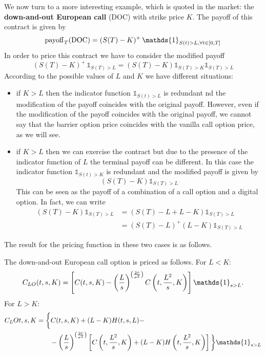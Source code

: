 We now turn to a more interesting example, which is quoted in the market: the \textbf{down-and-out European call} (DOC) with strike price $K$. The payoff of this contract is given by
\begin{equation}
  \pay_T(\text{DOC}) = (S(T)-K)^+\,\mathds{1}_{S(t)>L,\forall t\in[0,T]}
\end{equation}
In order to price this contract we have to consider the modified payoff
\begin{equation}
  (S(T)-K)^+\,\mathds{1}_{S(T)>L} = (S(T)-K)\mathds{1}_{S(T)>K}\mathds{1}_{S(T)>L}
\end{equation}
According to the possible values of $L$ and $K$ we have different situations:
\begin{itemize}
  \item if $K>L$ then the indicator function $\mathds{1}_{S(t)>L}$ is redundant nd the modification of the payoff coincides with the original payoff. However, even if the modification of the payoff coincides with the original payoff, we cannot say that the barrier option price coincides with the vanilla call option price, as we will see.
  \item if $K>L$ then we can exercise the contract but due to the presence of the indicator function of $L$ the terminal payoff can be different. In this case the indicator function $\mathds{1}_{S(t)>K}$ is redundant and the modified payoff is given by
  \begin{equation*}
    (S(T)-K)\mathds{1}_{S(T)>L}
  \end{equation*}
  This can be seen as the payoff of a combination of a call option and a digital option. In fact, we can write
  \begin{align*}
    (S(T)-K)\mathds{1}_{S(T)>L} &= (S(T)-L+L-K)\mathds{1}_{S(T)>L} \\
    &=
    (S(T)-L)^+ (L-K)\mathds{1}_{S(T)>L}
  \end{align*}
\end{itemize}
The result for the pricing function in these two cases is as follows.
\begin{proposition}
  The down-and-out European call option is priced as follows. For $L<K$:
  \begin{equation}\label{clo}
    C_{LO}(t,s,K) = \left[C(t,s,K)-\left(\frac{L}{s}\right)^{\left(\frac{2\Tilde{r}}{\sigma^2}\right)} C\left(t,\frac{L^2}{s},K\right)\right]\mathds{1}_{s>L}.
  \end{equation}
  For $L>K$:
  \begin{align}
      \notag C_LO{t,s,K} &= \bigg\{C(t,s,K) + (L-K)H(t,s,L) - \\
      &\qquad
      - \left(\frac{L}{s}\right)^{\left(\frac{2\Tilde{r}}{\sigma^2}\right)}
      \left[C\left(t,\frac{L^2}{s},K\right) + (L-K)H\left(t,\frac{L^2}{s},K\right)\right]\bigg\}\mathds{1}_{s>L}
  \end{align}
\end{proposition}
